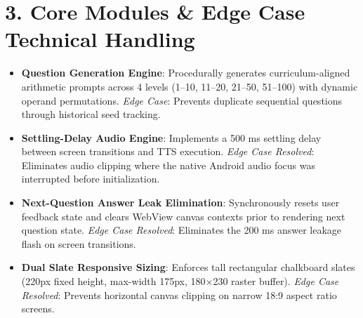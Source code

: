 \documentclass[10pt,a4paper]{article}
\begin{document}
\vspace{-4pt}
\section*{3. Core Modules \& Edge Case Technical Handling}

\begin{itemize}[itemsep=2.5pt]
    \item \textbf{Question Generation Engine}: Procedurally generates curriculum-aligned arithmetic prompts across 4 levels (1--10, 11--20, 21--50, 51--100) with dynamic operand permutations. \textit{Edge Case}: Prevents duplicate sequential questions through historical seed tracking.
    \item \textbf{Settling-Delay Audio Engine}: Implements a 500 ms settling delay between screen transitions and TTS execution. \textit{Edge Case Resolved}: Eliminates audio clipping where the native Android audio focus was interrupted before initialization.
    \item \textbf{Next-Question Answer Leak Elimination}: Synchronously resets user feedback state and clears WebView canvas contexts prior to rendering next question state. \textit{Edge Case Resolved}: Eliminates the 200 ms answer leakage flash on screen transitions.
    \item \textbf{Dual Slate Responsive Sizing}: Enforces tall rectangular chalkboard slates (220px fixed height, max-width 175px, 180$\times$230 raster buffer). \textit{Edge Case Resolved}: Prevents horizontal canvas clipping on narrow 18:9 aspect ratio screens.
\end{itemize}

\clearpage

\end{document}
